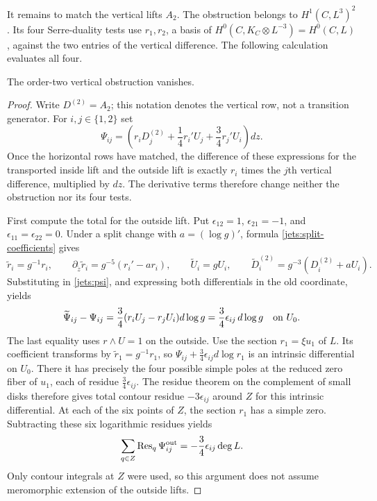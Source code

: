It remains to match the vertical lifts $A_2$.  The obstruction belongs
to $H^1(C,L^3)^2$.  Its four Serre-duality tests use $r_1,r_2$, a basis
of $H^0(C,K_C\otimes L^{-3})=H^0(C,L)$, against the two entries of
the vertical difference.  The following calculation evaluates all four.

\begin{lemma}\label{jets:second-obstruction}
The order-two vertical obstruction vanishes.
\end{lemma}

\begin{proof}
Write $D^{(2)}=A_2$; this notation denotes the vertical row, not a
transition generator.  For $i,j\in\{1,2\}$ set
\begin{equation}\label{jets:psi}
 \Psi_{ij}=\left(r_iD_j^{(2)}+\frac14r_i'U_j
                          +\frac34r_j'U_i\right)dz.
\end{equation}
Once the horizontal rows have matched, the difference of these
expressions for the transported inside lift and the outside lift is
exactly $r_i$ times the $j$th vertical difference, multiplied by $dz$.
The derivative terms therefore change neither the obstruction nor its
four tests.

First compute the total for the outside lift.  Put
$\epsilon_{12}=1$, $\epsilon_{21}=-1$, and
$\epsilon_{11}=\epsilon_{22}=0$.
Under a split change with $a=(\log g)'$, formula
\eqref{jets:split-coefficients} gives
\[
 \widetilde r_i=g^{-1}r_i,\qquad
 \partial_{\widetilde z}\widetilde r_i=g^{-5}(r_i'-ar_i),\qquad
 \widetilde U_i=gU_i,\qquad
 \widetilde D_i^{(2)}=g^{-3}(D_i^{(2)}+aU_i).
\]
Substituting in \eqref{jets:psi}, and expressing both differentials in
the old coordinate, yields
\begin{equation}\label{jets:psi-transformation}
 \widetilde\Psi_{ij}-\Psi_{ij}
 =\frac34(r_iU_j-r_jU_i)d\log g
 =\frac34\epsilon_{ij}\,d\log g
 \quad\hbox{on }U_0.
\end{equation}
The last equality uses $r\wedge U=1$ on the outside.
Use the section $r_1=\xi u_1$ of $L$.  Its coefficient transforms by
$\widetilde r_1=g^{-1}r_1$, so
$\Psi_{ij}+\frac34\epsilon_{ij}d\log r_1$ is an intrinsic differential
on $U_0$.  There it has precisely the four possible simple poles at
the reduced zero fiber of $u_1$, each of residue
$\frac34\epsilon_{ij}$.  The residue theorem on the complement of
small disks therefore gives total contour residue $-3\epsilon_{ij}$
around $Z$ for this intrinsic differential.  At each of the six
points of $Z$, the section $r_1$ has a simple zero.  Subtracting these
six logarithmic residues yields
\begin{equation}\label{jets:outside-residue}
 \sum_{q\in Z}\operatorname{Res}_q\Psi_{ij}^{\mathrm{out}}
 =-\frac34\epsilon_{ij}\deg L.
\end{equation}
Only contour integrals at $Z$ were used, so this argument does not
assume meromorphic extension of the outside lifts.


\end{proof}
